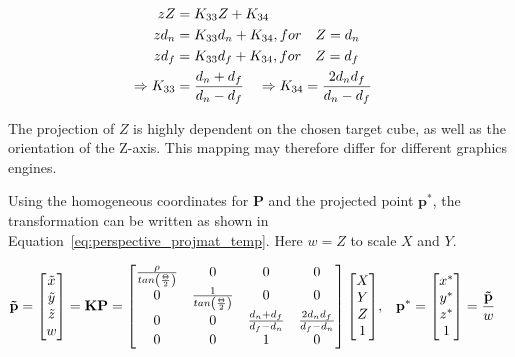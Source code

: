 \begin{equation}
    \begin{aligned}
        zZ &= K_{33} Z + K_{34} &\\
        zd_n &= K_{33} d_n + K_{34} \hfill, for \quad Z = d_n \\
        zd_f &= K_{33} d_f + K_{34} \hfill, for \quad Z = d_f \\
        \Rightarrow K_{33} &= \frac{d_n+d_f}{d_n-d_f} \quad \Rightarrow K_{34} = \frac{2d_n d_f}{d_n-d_f}
    \end{aligned}
    \label{eq:perspective_zeqs}
\end{equation}

The projection of $Z$ is highly dependent on the chosen target cube, as well as the orientation of the Z-axis. This mapping may therefore differ for different graphics engines. 

Using the homogeneous coordinates for $\mathbf{P}$ and the projected point $\mathbf{p}^*$, the transformation can be written as shown in Equation~\eqref{eq:perspective_projmat_temp}. Here $w = Z$ to scale $X$ and $Y$.

\begin{equation}
    \begin{aligned}
        \mathbf{\Tilde{p}} = \begin{bmatrix}
            \Tilde{x} \\ \Tilde{y} \\ \Tilde{z} \\ w
        \end{bmatrix} = \mathbf{K}\mathbf{P} = \begin{bmatrix}
            \frac{\rho}{tan\left(\frac{\Theta}{2}\right)}& 0 & 0 & 0 \\
            0 & \frac{1}{tan\left(\frac{\Theta}{2}\right)}& 0 & 0 \\
            0 & 0 & \frac{d_n+d_f}{d_f-d_n} & \frac{2d_n d_f}{d_f-d_n} \\
            0 & 0 & 1 & 0
        \end{bmatrix} \begin{bmatrix}
            X \\ Y \\ Z \\ 1
        \end{bmatrix}
        &,& & \mathbf{p^*} = \begin{bmatrix}
            x^* \\ y^* \\ z^* \\ 1
        \end{bmatrix} = 
        \frac{\mathbf{\Tilde{p}}}{w}
    \end{aligned}
    \label{eq:perspective_projmat_temp}
\end{equation}

